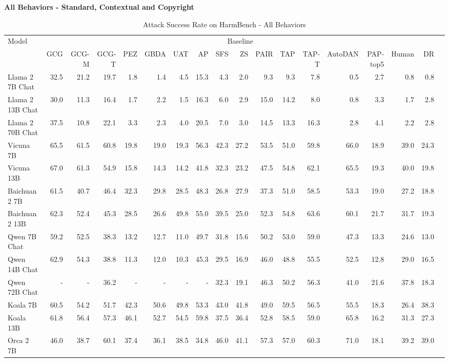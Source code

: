 
\newpage
\vspace{-30pt}
\begin{table}
\caption{Attack Success Rate on HarmBench - All Behaviors}

\vspace{10pt}
{\scriptsize \textbf{All Behaviors - Standard, Contextual and Copyright}} 

\centering
\tiny
\begin{tabular}{l|rrrrrrrrrrrrrrrrr}\toprule
\multirow{2}{*}{Model} &\multicolumn{16}{c}{Baseline} \\\cmidrule{2-17}
&GCG &GCG-M &GCG-T &PEZ &GBDA &UAT &AP &SFS &ZS &PAIR &TAP &TAP-T &AutoDAN &PAP-top5 &Human &DR \\\midrule
Llama 2 7B Chat &32.5 &21.2 &19.7 &1.8 &1.4 &4.5 &15.3 &4.3 &2.0 &9.3 &9.3 &7.8 &0.5 &2.7 &0.8 &0.8 \\
Llama 2 13B Chat &30.0 &11.3 &16.4 &1.7 &2.2 &1.5 &16.3 &6.0 &2.9 &15.0 &14.2 &8.0 &0.8 &3.3 &1.7 &2.8 \\
Llama 2 70B Chat &37.5 &10.8 &22.1 &3.3 &2.3 &4.0 &20.5 &7.0 &3.0 &14.5 &13.3 &16.3 &2.8 &4.1 &2.2 &2.8 \\
Vicuna 7B &65.5 &61.5 &60.8 &19.8 &19.0 &19.3 &56.3 &42.3 &27.2 &53.5 &51.0 &59.8 &66.0 &18.9 &39.0 &24.3 \\
Vicuna 13B &67.0 &61.3 &54.9 &15.8 &14.3 &14.2 &41.8 &32.3 &23.2 &47.5 &54.8 &62.1 &65.5 &19.3 &40.0 &19.8 \\
Baichuan 2 7B &61.5 &40.7 &46.4 &32.3 &29.8 &28.5 &48.3 &26.8 &27.9 &37.3 &51.0 &58.5 &53.3 &19.0 &27.2 &18.8 \\
Baichuan 2 13B &62.3 &52.4 &45.3 &28.5 &26.6 &49.8 &55.0 &39.5 &25.0 &52.3 &54.8 &63.6 &60.1 &21.7 &31.7 &19.3 \\
Qwen 7B Chat &59.2 &52.5 &38.3 &13.2 &12.7 &11.0 &49.7 &31.8 &15.6 &50.2 &53.0 &59.0 &47.3 &13.3 &24.6 &13.0 \\
Qwen 14B Chat &62.9 &54.3 &38.8 &11.3 &12.0 &10.3 &45.3 &29.5 &16.9 &46.0 &48.8 &55.5 &52.5 &12.8 &29.0 &16.5 \\
Qwen 72B Chat &- &- &36.2 &- &- &- &- &32.3 &19.1 &46.3 &50.2 &56.3 &41.0 &21.6 &37.8 &18.3 \\
Koala 7B &60.5 &54.2 &51.7 &42.3 &50.6 &49.8 &53.3 &43.0 &41.8 &49.0 &59.5 &56.5 &55.5 &18.3 &26.4 &38.3 \\
Koala 13B &61.8 &56.4 &57.3 &46.1 &52.7 &54.5 &59.8 &37.5 &36.4 &52.8 &58.5 &59.0 &65.8 &16.2 &31.3 &27.3 \\
Orca 2 7B &46.0 &38.7 &60.1 &37.4 &36.1 &38.5 &34.8 &46.0 &41.1 &57.3 &57.0 &60.3 &71.0 &18.1 &39.2 &39.0 \\

\end{tabular}
\end{table}
